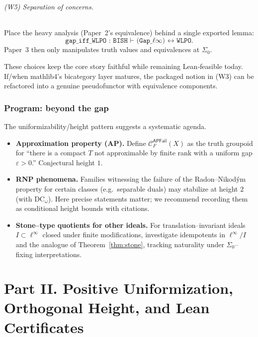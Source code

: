 \documentclass[11pt]{article}
\theoremstyle{definition}
\theoremstyle{remark}
\newcommand{\linf}{\ell^\infty}
\newcommand{\SigmaZero}{\Sigma_{0}}
\begin{document}
\paragraph{(W5) Separation of concerns.}
Place the heavy analysis (Paper~2’s equivalence) behind a single exported lemma:
\[
  \texttt{gap\_iff\_WLPO : BISH ⊢ (Gap\_ℓ∞) ↔ WLPO.}
\]
Paper~3 then only manipulates truth values and equivalences at \(\SigmaZero\).

\medskip
\noindent
These choices keep the core story faithful while remaining Lean‑feasible today. If/when mathlib4’s bicategory layer matures, the packaged notion in (W3) can be refactored into a genuine pseudofunctor with equivalence components.

\section{Program: beyond the gap}\label{sec:program}

The uniformizability/height pattern suggests a systematic agenda.
\begin{itemize}
\item \textbf{Approximation property (AP).} Define \(\mathcal C^{\mathsf{APFail}}_F(X)\) as the truth groupoid for “there is a compact \(T\) not approximable by finite rank with a uniform gap \(\varepsilon>0\).” Conjectural height \(1\).
\item \textbf{RNP phenomena.} Families witnessing the failure of the Radon–Nikodým property for certain classes (e.g.\ separable duals) may stabilize at height \(2\) (with \(\mathrm{DC}_\omega\)). Here precise statements matter; we recommend recording them as conditional height bounds with citations.
\item \textbf{Stone--type quotients for other ideals.} For translation–invariant ideals \(I\subset\linf\) closed under finite modifications, investigate idempotents in \(\linf/I\) and the analogue of Theorem~\ref{thm:stone}, tracking naturality under \(\SigmaZero\)–fixing interpretations.
\end{itemize}

\part*{Part II. Positive Uniformization, Orthogonal Height, and Lean Certificates}
\end{document}
